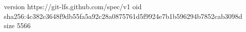 version https://git-lfs.github.com/spec/v1
oid sha256:4c382c3648f9db55fa5a92c28a0875761d5f9924e7b1b596294b7852cab3098d
size 5566
